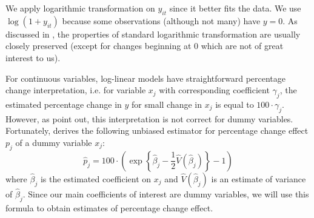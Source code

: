  We apply logarithmic transformation on $y_{it}$ since it better fits the data.  We use $\log\left(1 + y_{it}\right)$ because some observations (although not many) have $y = 0$. As discussed in \citet[p. 193]{wooldridge_introductory_2015},  the 
 properties of standard logarithmic transformation
 are usually  closely preserved (except for changes beginning at 0 which are not of great interest to us).   

For continuous variables, log-linear models have straightforward percentage change interpretation, i.e. for variable $x_j$ with corresponding coefficient $\gamma_j$, the estimated percentage change in $y$ for small change in $x_j$ is equal to $100 \cdot \gamma_j$. However, as \citet{halvorsen_interpretation_1980} point out, this interpretation is not correct for dummy variables. Fortunately, \citet{kennedy_estimation_1981} derives the following unbiased estimator for percentage change effect $p_j$ of a dummy variable $x_j$:
\begin{equation}
\hat p_j = 100 \cdot \left(\exp\left\{\hat\beta_j - \frac{1}{2} \hat V\left(\hat\beta_j\right)\right\} - 1 \right)
 \label{eq:dummy_vars}
\end{equation}
where $\hat\beta_j$ is the estimated coefficient on $x_j$ and  $\hat V\left(\hat\beta_j\right)$ is an estimate of variance of $\hat\beta_j$. 
Since our main coefficients of interest are dummy variables, we will use this formula to obtain estimates of percentage change effect.




